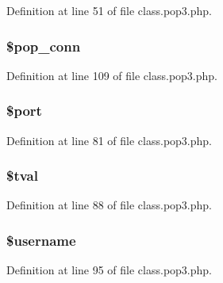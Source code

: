 Definition at line 51 of file class.\+pop3.\+php.

\subsubsection[{\texorpdfstring{\$pop\+\_\+conn}{$pop_conn}}]{\setlength{\rightskip}{0pt plus 5cm}\$pop\+\_\+conn\hspace{0.3cm}{\ttfamily [protected]}}\hypertarget{class_p_o_p3_ae846263e987b8fece9591cc0c2566b50}{}\label{class_p_o_p3_ae846263e987b8fece9591cc0c2566b50}


Definition at line 109 of file class.\+pop3.\+php.

\subsubsection[{\texorpdfstring{\$port}{$port}}]{\setlength{\rightskip}{0pt plus 5cm}\${\bf port}}\hypertarget{class_p_o_p3_aa0787efab4b22e8a212882f3409d4c77}{}\label{class_p_o_p3_aa0787efab4b22e8a212882f3409d4c77}


Definition at line 81 of file class.\+pop3.\+php.

\subsubsection[{\texorpdfstring{\$tval}{$tval}}]{\setlength{\rightskip}{0pt plus 5cm}\$tval}\hypertarget{class_p_o_p3_a19650abd43de047c5f64c5a1a84e4533}{}\label{class_p_o_p3_a19650abd43de047c5f64c5a1a84e4533}


Definition at line 88 of file class.\+pop3.\+php.

\subsubsection[{\texorpdfstring{\$username}{$username}}]{\setlength{\rightskip}{0pt plus 5cm}\${\bf username}}\hypertarget{class_p_o_p3_a0eb82aa5f81cf845de4b36cd653c42cf}{}\label{class_p_o_p3_a0eb82aa5f81cf845de4b36cd653c42cf}


Definition at line 95 of file class.\+pop3.\+php.

